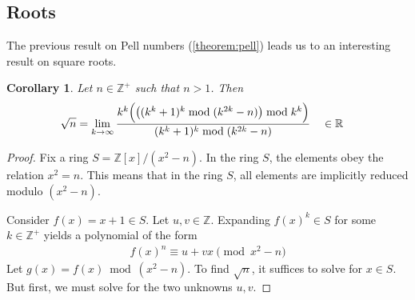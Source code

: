 \documentclass[11pt,reqno]{article}
\theoremstyle{plain}
\newtheorem{corollary}[theorem]{Corollary}
\theoremstyle{definition}
\begin{document}
\subsection{Roots}
The previous result on Pell numbers (\cref{theorem:pell}) leads us to an interesting result on square roots.

\begin{corollary} \label{corollary:squareroots}
Let $n \in \mathbb{Z}^+$ such that $n > 1$. Then
\begin{align*}
\sqrt{n} &= \lim_{k\rightarrow\infty}
    \frac{k^k \Bigl( \bigl( (k^k + 1)^k \bmod{(k^{2k}-n)} \bigr) \bmod{k^k} \Bigr)}
        {(k^k + 1)^k \bmod{(k^{2k}-n)}}  \quad \in \mathbb{R}
\end{align*}
\end{corollary}
\begin{proof}
Fix a ring $S = \mathbb{Z}[x]/(x^2 - n)$. In the ring $S$, the elements obey the relation $x^2 = n$. This means that in the ring $S$, all elements are implicitly reduced modulo $(x^2 - n)$.

Consider $f(x) = x+1 \in S$. Let $u,v \in \mathbb{Z}$. Expanding $f(x)^k \in S$ for some $k \in \mathbb{Z}^+$ yields a polynomial of the form
\begin{align*}
f(x)^n \equiv u + v x \pmod{x^2 - n}
\end{align*}
Let $g(x) = f(x) \bmod{(x^2-n)}$. To find $\sqrt{n}$, it suffices to solve for $x \in S$. But first, we must solve for the two unknowns $u,v$.


\end{proof}
\end{document}
